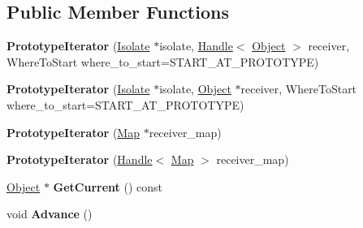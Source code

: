 \subsection*{Public Member Functions}
\begin{DoxyCompactItemize}
\item 
\hypertarget{classv8_1_1internal_1_1_prototype_iterator_aae2238fb875082cb763e3c2988105e7d}{}{\bfseries Prototype\+Iterator} (\hyperlink{classv8_1_1internal_1_1_isolate}{Isolate} $\ast$isolate, \hyperlink{classv8_1_1internal_1_1_handle}{Handle}$<$ \hyperlink{classv8_1_1internal_1_1_object}{Object} $>$ receiver, Where\+To\+Start where\+\_\+to\+\_\+start=S\+T\+A\+R\+T\+\_\+\+A\+T\+\_\+\+P\+R\+O\+T\+O\+T\+Y\+P\+E)\label{classv8_1_1internal_1_1_prototype_iterator_aae2238fb875082cb763e3c2988105e7d}

\item 
\hypertarget{classv8_1_1internal_1_1_prototype_iterator_a3636c45d041e9af16d0bd8ad87a425bc}{}{\bfseries Prototype\+Iterator} (\hyperlink{classv8_1_1internal_1_1_isolate}{Isolate} $\ast$isolate, \hyperlink{classv8_1_1internal_1_1_object}{Object} $\ast$receiver, Where\+To\+Start where\+\_\+to\+\_\+start=S\+T\+A\+R\+T\+\_\+\+A\+T\+\_\+\+P\+R\+O\+T\+O\+T\+Y\+P\+E)\label{classv8_1_1internal_1_1_prototype_iterator_a3636c45d041e9af16d0bd8ad87a425bc}

\item 
\hypertarget{classv8_1_1internal_1_1_prototype_iterator_a65096861a41353f1f2da75d57bdd00e5}{}{\bfseries Prototype\+Iterator} (\hyperlink{classv8_1_1internal_1_1_map}{Map} $\ast$receiver\+\_\+map)\label{classv8_1_1internal_1_1_prototype_iterator_a65096861a41353f1f2da75d57bdd00e5}

\item 
\hypertarget{classv8_1_1internal_1_1_prototype_iterator_abda62e063f1b70a4d4248c579627c5ba}{}{\bfseries Prototype\+Iterator} (\hyperlink{classv8_1_1internal_1_1_handle}{Handle}$<$ \hyperlink{classv8_1_1internal_1_1_map}{Map} $>$ receiver\+\_\+map)\label{classv8_1_1internal_1_1_prototype_iterator_abda62e063f1b70a4d4248c579627c5ba}

\item 
\hypertarget{classv8_1_1internal_1_1_prototype_iterator_a58a5ac7010eba53058c5204e1c5f939f}{}\hyperlink{classv8_1_1internal_1_1_object}{Object} $\ast$ {\bfseries Get\+Current} () const \label{classv8_1_1internal_1_1_prototype_iterator_a58a5ac7010eba53058c5204e1c5f939f}

\item 
\hypertarget{classv8_1_1internal_1_1_prototype_iterator_aac13aff50ca8b7566887d078e4102ff8}{}void {\bfseries Advance} ()\label{classv8_1_1internal_1_1_prototype_iterator_aac13aff50ca8b7566887d078e4102ff8}


\end{DoxyCompactItemize}
